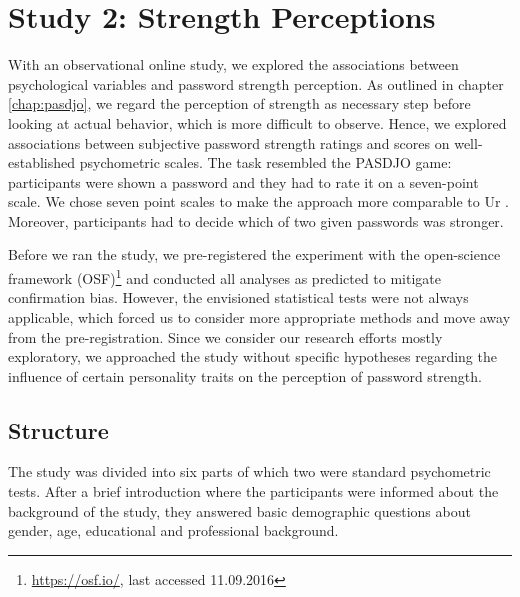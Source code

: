 \section{Study 2: Strength Perceptions}
With an observational online study, we explored the associations between psychological variables and password strength perception. As outlined in chapter \ref{chap:pasdjo}, we regard the perception of strength as necessary step before looking at actual behavior, which is more difficult to observe. Hence, we explored associations between subjective password strength ratings and scores on well-established psychometric scales. 
The task resembled the PASDJO game: participants were shown a password and they had to rate it on a seven-point scale. We chose seven point scales to make the approach more comparable to Ur \etal \cite{Ur2016PerceptionsPassword}. Moreover, participants had to decide which of two given passwords was stronger. 

Before we ran the study, we pre-registered the experiment with the open-science framework (OSF)\footnote{\url{https://osf.io/}, last accessed 11.09.2016} and conducted all analyses as predicted to mitigate confirmation bias. However, the envisioned statistical  tests were not always applicable, which forced us to consider more appropriate methods and move away from the pre-registration. Since we consider our research efforts mostly exploratory, we approached the study without specific hypotheses regarding the influence of certain personality traits on the perception of password strength.

\subsection{Structure}
The study was divided into six parts of which two were standard psychometric tests. After a brief introduction where the participants were informed about the background of the study, they answered basic demographic questions about gender, age, educational and professional background. %

